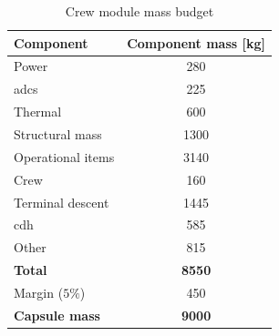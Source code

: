 \begin{table}[h]
\centering
\caption{Crew module mass budget}
\label{tab:crewmass}
\begin{tabular}{|l|c|}
\hline
{\bf Component}    & {\bf Component mass {[}kg{]}} \\ \hline \hline
Power              & 280                           \\ \hline
 \gls{adcs}        &  225                     \\ \hline
Thermal            & 600                           \\ \hline
Structural mass    & 1300                          \\ \hline
Operational items  & 3140                          \\ \hline
Crew               & 160                           \\ \hline
Terminal descent   & 1445                          \\ \hline
\gls{cdh}          & 585                           \\ \hline 
Other    & 815                          \\ \hline \hline
\textbf{Total}    & \textbf{8550}                          \\ \hline \hline
Margin ($5\%$)  & 450                        \\ \hline \hline
{\bf Capsule mass} & {\bf 9000}                    \\ \hline
\end{tabular}
\end{table}